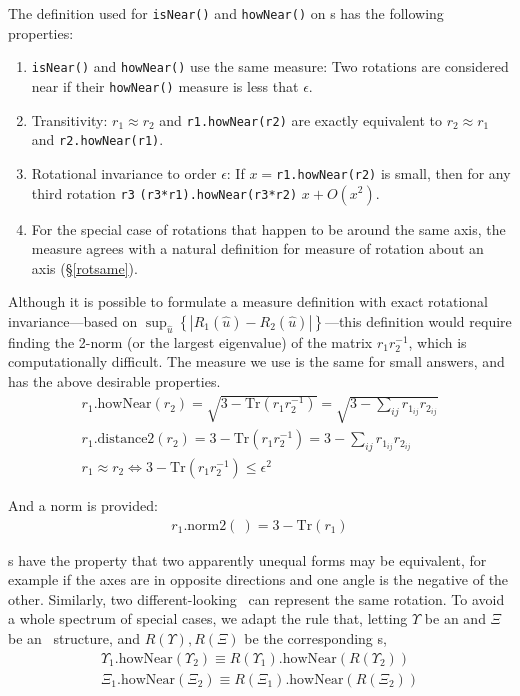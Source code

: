 The definition used for {\tt isNear()} and {\tt howNear()} on \Rotation s
has the following properties:
\begin{enumerate}
\item {\tt isNear()} and {\tt howNear()} use the same measure:  Two rotations
are considered near if their {\tt howNear()} measure is less that $\epsilon$.
\item Transitivity:  $r_1 \approx r_2$ and {\tt r1.howNear(r2)}
are exactly equivalent to $r_2 \approx r_1$ and {\tt r2.howNear(r1)}.
\item Rotational invariance to order $\epsilon$:
If $x = ${\tt r1.howNear(r2)} is small, then for any third rotation {\tt r3}
 {\tt (r3*r1).howNear(r3*r2)} $ x + O(x^2)$.
\item For the special case of rotations that happen to be around the same axis,
the measure agrees with a natural definition for measure of rotation about an
axis (\S\ref{rotsame}).
\end{enumerate}

Although it is possible to formulate a measure definition with exact rotational
in\-var\-i\-ance---based on $
\sup_{\hat{u}} \left\{
\left| R_1(\hat{u}) - R_2(\hat{u}) \right|
\right\}
$---this definition would require finding the 2-norm (or the largest eigenvalue)
of the matrix $r_1 r_2^{-1}$, which is computationally difficult.
The measure we use is the same for small answers, and has the above desirable
properties.
\begin{eqnarray}
\label{eq:nearrot}
  r_1 \mbox{.howNear}(r_2) = \sqrt{ 3 - \mbox{Tr}(r_1 r_2^{-1}) }
	= \sqrt {3 - \sum_{ij} r_{1_{ij}} r_{2_{ij}} }
	\\
\label{eq:dist2rot}
  r_1 \mbox{.distance2}(r_2) = 3 - \mbox{Tr}(r_1 r_2^{-1}) 
	= 3 - \sum_{ij} r_{1_{ij}} r_{2_{ij}} 
	\\
  r_1 \approx r_2 \Longleftrightarrow 3 - \mbox{Tr}(r_1 r_2^{-1})
		\leq \epsilon^2
\end{eqnarray}

And a norm is provided:
\begin{eqnarray}
\label{eq:norm2rot}
  r_1 \mbox{.norm2}(~) = 3 - \mbox{Tr}(r_1) 
\end{eqnarray}


\Ax s have the property that two apparently unequal forms may be equivalent,
for example if the axes are in opposite directions and one angle is the
negative of the other.  
Similarly, two different-looking \Es\ can represent the same
rotation.  To avoid a whole spectrum of special cases, we adapt the rule that,
letting $\Upsilon$ be an \Ax and $\Xi$ be an \Es\ structure, and
$R(\Upsilon), R(\Xi)$ be the corresponding \Ro s,
\begin{eqnarray}
  \Upsilon_1 \mbox{.howNear} (\Upsilon_2) \equiv
	R \left( \Upsilon_1 \right) \mbox{.howNear}
	\left( R \left( \Upsilon_2 \right) \right)
	\\
  \Xi_1 \mbox{.howNear} (\Xi_2) \equiv
	R \left( \Xi_1 \right) \mbox{.howNear}
	\left( R \left( \Xi_2 \right) \right)
\end{eqnarray}

